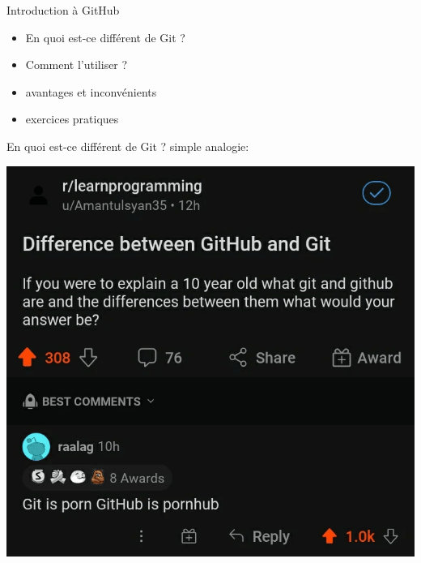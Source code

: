 \documentclass[usenames,dvipsnames]{beamer}
\begin{document}
\begin{frame}[fragile]{Introduction à GitHub}
	\begin{itemize}
		\item En quoi est-ce différent de Git ?
		\item Comment l'utiliser ?
		\item avantages et inconvénients
		\item exercices pratiques
	\end{itemize}
\end{frame}

\begin{frame}[fragile]{En quoi est-ce différent de Git ?}
	simple analogie:
	\begin{center}
		\includegraphics[width=0.70\linewidth]{Im/git_porn.png}
	\end{center}
\end{frame}
\end{document}
